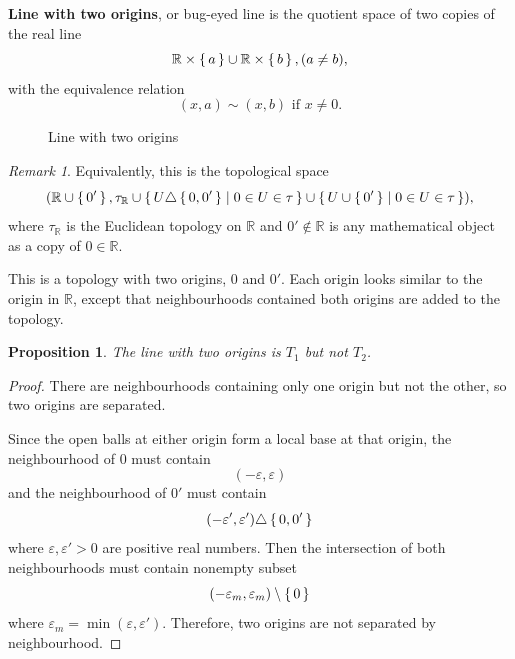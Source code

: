 \documentclass[12pt, letterpaper]{article}
\newcommand{\re}{\mathbb{R}}
\newtheorem{prop}{Proposition}[section]
\theoremstyle{definition}
\theoremstyle{remark}
\newtheorem*{rem*}{Remark}
\theoremstyle{definition}
\theoremstyle{plain}
\numberwithin{equation}{section}
\begin{document}
	\begin{def*}
		\textbf{Line with two origins}, or bug-eyed line is the quotient space of two copies of the real line
		\[\re \times \set{a} \cup  \re\times\set{b}, (a\ne b), \]
		with the equivalence relation\[ (x,a)\sim (x,b) {\text{ if }}x\neq 0.\]
		\begin{figure}[H]
			\centering
			\caption{Line with two origins}
			\label{fig:line_with_two_origins}
		\end{figure}
	\end{def*}
	\begin{rem*}
		Equivalently, this is the topological space
		\[(\re\cup\set{0'} ,\tau_{\re} \cup \set{U\triangle \set{0,0'} | 0 \in U \in \tau }\cup \set{U\cup \set{0'} | 0 \in U \in \tau } ),\]
		where $\tau_{\re}$ is the Euclidean topology on $\re$ and $0'\notin\re$ is any mathematical object as a copy of $0\in\re$.
		
		This is a topology with two origins, $0$ and $0'$.
		Each origin looks similar to the origin in $\re$,
		except that neighbourhoods contained both origins are added to the topology.
		
	\end{rem*}

	\begin{prop}
		The line with two origins is $T_1$ but not $T_2$.
	\end{prop}
	\begin{proof}
		There are neighbourhoods containing only one origin but not the other, so two origins are separated.
		
		Since the open balls at either origin form a local base at that origin,
		the neighbourhood of $0$ must contain
		\[ (-\varepsilon,\varepsilon) \]
		and the neighbourhood of $0'$ must contain
		\[ (-\varepsilon',\varepsilon')\triangle\set{0,0'} \]
		where $\varepsilon,\varepsilon'>0$ are positive real numbers.
		Then the intersection of both neighbourhoods must contain nonempty subset
		\[ (-\varepsilon_m,\varepsilon_m)\setminus\set{0} \]
		where $\varepsilon_m=\min(\varepsilon,\varepsilon')$.
		Therefore, two origins are not separated by neighbourhood.
	\end{proof}
\end{document}
